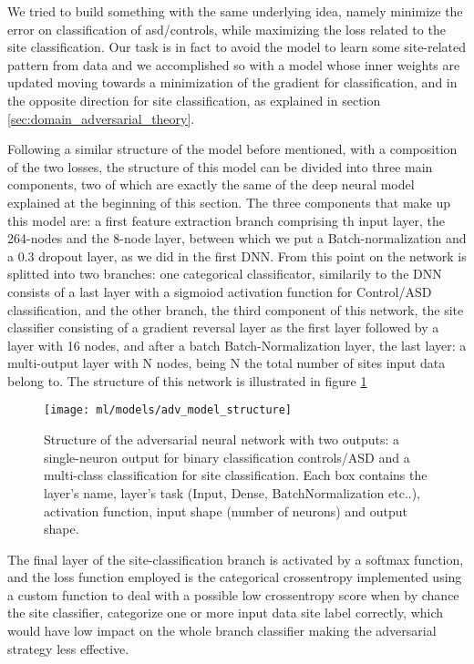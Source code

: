 \documentclass[10pt]{report}
\begin{document}
We tried to build something with the same underlying idea, namely minimize the error on classification of asd/controls, while maximizing the loss related to the site classification.
Our task is in fact to avoid the model to learn some site-related pattern from data and we accomplished so with a model whose inner weights are updated moving towards a minimization of the gradient for classification, and in the opposite direction for site classification, as explained in section \ref{sec:domain_adversarial_theory}.

Following a similar structure of the model before mentioned, with a composition of the two losses, the structure of this model can be divided into three main components, two of which are exactly the same of the deep neural model explained at the beginning of this section.
The three components that make up this model are: a first feature extraction branch comprising th input layer, the 264-nodes and the 8-node layer, between which we put a Batch-normalization and a 0.3 dropout layer, as we did in the first DNN.
From this point on the network is splitted into two branches: one categorical classificator, similarily to the DNN consists of a last layer with a sigmoiod activation function for Control/ASD classification,
and the other branch, the third component of this network, the site classifier consisting of a gradient reversal layer as the first layer followed by a layer with 16 nodes, and after a batch Batch-Normalization layer, the last layer: a multi-output layer with N nodes, being N the total number of sites input data belong to.
The structure of this network is illustrated in figure \ref{fig:adv_model_structure}


\begin{figure}[h!]
\centering
\texttt{[image: ml/models/adv\_model\_structure]}
\caption{Structure of the adversarial neural network with two outputs: a single-neuron output for binary classification controls/ASD and a multi-class classification for site classification.
Each box contains the layer's name, layer's task (Input, Dense, BatchNormalization etc..), activation function, input shape (number of neurons) and output shape.
}
\label{fig:adv_model_structure}
\end{figure}


The final layer of the site-classification branch is activated by a softmax function, and the loss function employed is the categorical crossentropy implemented using a custom function to deal with a possible low crossentropy score when by chance the site classifier, categorize one or more input data site label correctly, which would have low impact on the whole branch classifier making the adversarial strategy less effective.
\end{document}
